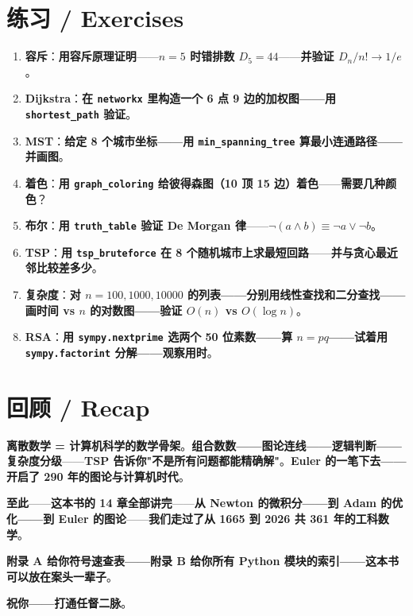 \section{练习 / Exercises}

\begin{enumerate}
\item \textbf{容斥}：\textbf{用容斥原理证明}——\textbf{$n=5$ 时错排数 $D_5 = 44$}——\textbf{并验证 $D_n/n! \to 1/e$}。
\item \textbf{Dijkstra}：\textbf{在 \texttt{networkx} 里构造一个 6 点 9 边的加权图——\textbf{用 \texttt{shortest\_path} 验证}}。
\item \textbf{MST}：\textbf{给定 8 个城市坐标——\textbf{用 \texttt{min\_spanning\_tree} 算最小连通路径}——\textbf{并画图}}。
\item \textbf{着色}：\textbf{用 \texttt{graph\_coloring} 给\textbf{彼得森图}（10 顶 15 边）着色}——\textbf{需要几种颜色}？
\item \textbf{布尔}：\textbf{用 \texttt{truth\_table} 验证 De Morgan 律}——\textbf{$\neg(a \land b) \equiv \neg a \lor \neg b$}。
\item \textbf{TSP}：\textbf{用 \texttt{tsp\_bruteforce} 在 8 个随机城市上求最短回路}——\textbf{并与贪心最近邻比较\textbf{差多少}}。
\item \textbf{复杂度}：\textbf{对 $n = 100, 1000, 10000$ 的列表——\textbf{分别用线性查找和二分查找——\textbf{画时间 vs $n$ 的对数图}——\textbf{验证 $O(n)$ vs $O(\log n)$}}}。
\item \textbf{RSA}：\textbf{用 \texttt{sympy.nextprime} 选两个 50 位素数——\textbf{算 $n = pq$}——\textbf{试着用 \texttt{sympy.factorint} 分解}——\textbf{观察用时}}。
\end{enumerate}

\section{回顾 / Recap}

\begin{tcolorbox}[essbox={本章一句话总结}]
\textbf{离散数学 = 计算机科学的数学骨架}。\textbf{组合数数——图论连线——逻辑判断——复杂度分级}——\textbf{TSP 告诉你"不是所有问题都能精确解"}。\textbf{Euler 的一笔下去——\textbf{开启了 290 年的图论与计算机时代}}。
\end{tcolorbox}

\textbf{至此}——\textbf{这本书的 14 章\textbf{全部讲完}}——\textbf{从 Newton 的微积分——到 Adam 的优化——到 Euler 的图论}——\textbf{我们走过了\textbf{从 1665 到 2026 共 361 年}的工科数学}。

\textbf{附录 A 给你\textbf{符号速查表}——\textbf{附录 B 给你\textbf{所有 Python 模块的索引}}——\textbf{这本书可以放在案头一辈子}}。

\textbf{祝你——\textbf{打通任督二脉}}。

\clearpage
